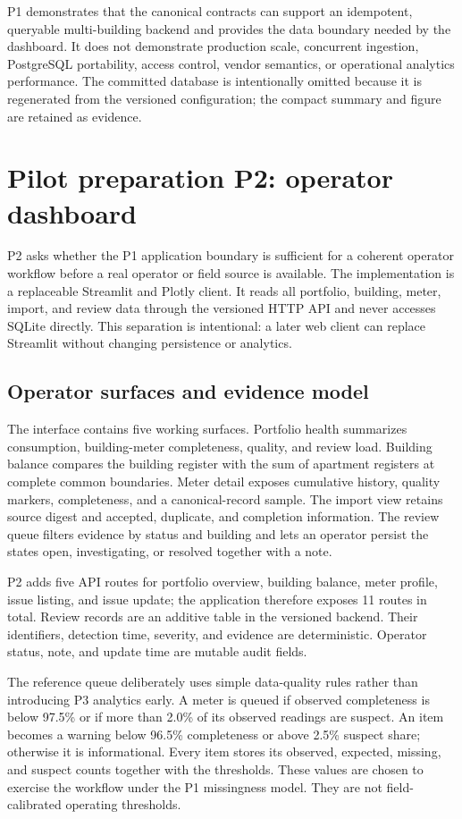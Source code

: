 \documentclass[11pt,a4paper]{article}
\begin{document}
P1 demonstrates that the canonical contracts can support an idempotent,
queryable multi-building backend and provides the data boundary needed by the
dashboard. It does not demonstrate production scale, concurrent ingestion,
PostgreSQL portability, access control, vendor semantics, or operational
analytics performance. The committed database is intentionally omitted because
it is regenerated from the versioned configuration; the compact summary and
figure are retained as evidence.

\FloatBarrier
\section{Pilot preparation P2: operator dashboard}
P2 asks whether the P1 application boundary is sufficient for a coherent
operator workflow before a real operator or field source is available. The
implementation is a replaceable Streamlit and Plotly client. It reads all
portfolio, building, meter, import, and review data through the versioned HTTP
API and never accesses SQLite directly. This separation is intentional: a later
web client can replace Streamlit without changing persistence or analytics.

\subsection{Operator surfaces and evidence model}
The interface contains five working surfaces. Portfolio health summarizes
consumption, building-meter completeness, quality, and review load. Building
balance compares the building register with the sum of apartment registers at
complete common boundaries. Meter detail exposes cumulative history, quality
markers, completeness, and a canonical-record sample. The import view retains
source digest and accepted, duplicate, and completion information. The review
queue filters evidence by status and building and lets an operator persist the
states open, investigating, or resolved together with a note.

P2 adds five API routes for portfolio overview, building balance, meter profile,
issue listing, and issue update; the application therefore exposes 11 routes in
total. Review records are an additive table in the versioned backend. Their
identifiers, detection time, severity, and evidence are deterministic. Operator
status, note, and update time are mutable audit fields.

The reference queue deliberately uses simple data-quality rules rather than
introducing P3 analytics early. A meter is queued if observed completeness is
below 97.5\% or if more than 2.0\% of its observed readings are suspect. An item
becomes a warning below 96.5\% completeness or above 2.5\% suspect share;
otherwise it is informational. Every item stores its observed, expected,
missing, and suspect counts together with the thresholds. These values are
chosen to exercise the workflow under the P1 missingness model. They are not
field-calibrated operating thresholds.
\end{document}
